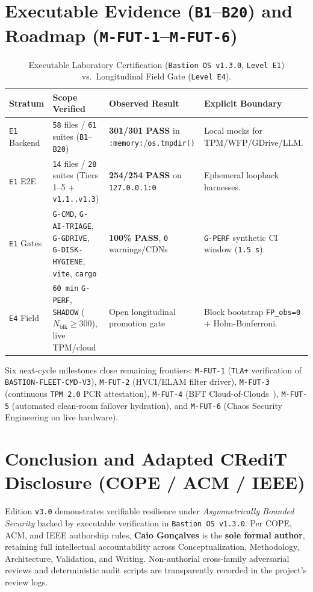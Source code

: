 \documentclass[10pt,twocolumn]{article}
\begin{document}
\section{Executable Evidence (\texttt{B1}--\texttt{B20}) and Roadmap (\texttt{M-FUT-1}--\texttt{M-FUT-6})}

\begin{table}[t]
\centering
\caption{Executable Laboratory Certification (\texttt{Bastion OS v1.3.0}, \texttt{Level E1}) vs.\ Longitudinal Field Gate (\texttt{Level E4}).}
\footnotesize
\begin{tabularx}{\textwidth}{@{}l Y Y Y@{}}
\toprule
\textbf{Stratum} & \textbf{Scope Verified} & \textbf{Observed Result} & \textbf{Explicit Boundary} \\
\midrule
\texttt{E1} Backend & \texttt{58} files / \texttt{61} suites (\texttt{B1}--\texttt{B20}) & \textbf{301/301 PASS} in \texttt{:memory:}/\texttt{os.tmpdir()} & Local mocks for TPM/WFP/GDrive/LLM. \\
\texttt{E1} E2E & \texttt{14} files / \texttt{28} suites (Tiers 1--5 + \texttt{v1.1..v1.3}) & \textbf{254/254 PASS} on \texttt{127.0.0.1:0} & Ephemeral loopback harnesses. \\
\texttt{E1} Gates & \texttt{G-CMD}, \texttt{G-AI-TRIAGE}, \texttt{G-GDRIVE}, \texttt{G-DISK-HYGIENE}, \texttt{vite}, \texttt{cargo} & \textbf{100\% PASS}, \texttt{0} warnings/CDNs & \texttt{G-PERF} synthetic CI window (\texttt{1.5 s}). \\
\texttt{E4} Field & \texttt{60 min} \texttt{G-PERF}, \texttt{SHADOW} ($N_{\mathrm{blk}} \ge 300$), live TPM/cloud & Open longitudinal promotion gate & Block bootstrap \texttt{FP\_obs=0} + Holm-Bonferroni. \\
\bottomrule
\end{tabularx}
\end{table}

Six next-cycle milestones close remaining frontiers: \texttt{M-FUT-1} (\texttt{TLA+} verification of \texttt{BASTION-FLEET-CMD-V3}), \texttt{M-FUT-2} (HVCI/ELAM filter driver), \texttt{M-FUT-3} (continuous \texttt{TPM 2.0} PCR attestation), \texttt{M-FUT-4} (BFT Cloud-of-Clouds~\cite{R23}), \texttt{M-FUT-5} (automated clean-room failover hydration), and \texttt{M-FUT-6} (Chaos Security Engineering on live hardware).

\section{Conclusion and Adapted CRediT Disclosure (COPE / ACM / IEEE)}

Edition \texttt{v3.0} demonstrates verifiable resilience under \emph{Asymmetrically Bounded Security} backed by executable verification in \texttt{Bastion OS v1.3.0}. Per COPE, ACM, and IEEE authorship rules, \textbf{Caio Gon\c{c}alves} is the \textbf{sole formal author}, retaining full intellectual accountability across Conceptualization, Methodology, Architecture, Validation, and Writing. Non-authorial cross-family adversarial reviews and deterministic audit scripts are transparently recorded in the project's review logs.



\end{document}

